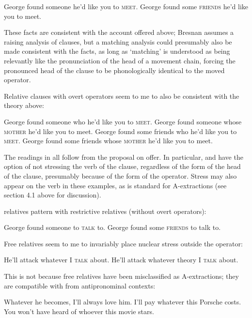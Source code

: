 \documentclass[output=paper]{LSP/langsci}
\begin{document}
\ea George found someone he'd like you to \textsc{meet}.
\ex George found some \textsc{friends} he'd like you to meet.
\z
\z

These facts are consistent with the account offered above; Bresnan assumes a raising analysis of  clauses, but a matching analysis could presumably also be made consistent with the facts, as long as `matching' is understood as being relevantly like the pronunciation of the head of a movement chain, forcing the pronounced head of the  clause to be phonologically identical to the moved operator.

  Relative clauses with overt operators seem to me to also be consistent with the theory above:


\ea%
    \label{ex:richards:48bis}
\ea \label{ex:richards:48bisa}George found someone who he'd like you to \textsc{meet}.
\ex \label{ex:richards:48bisb}George found someone whose \textsc{mother} he'd like you to meet.
\ex \label{ex:richards:48bisc}George found some friends who he'd like you to \textsc{meet}.
\ex \label{ex:richards:48bisd} George found some friends whose \textsc{mother} he'd like you to meet.
\z
\z

The readings in  all follow from the proposal on offer.  In particular,  and  have the option of not stressing the verb of the  clause, regardless of the form of the head of the  clause, presumably because of the form of the  operator.  Stress may also appear on the verb in these examples, as is standard for A-extractions (see section 4.1 above for discussion).

   relatives pattern with restrictive relatives (without overt operators):


\ea%
    \label{ex:richards:49}
\ea George found someone to \textsc{talk} to.
\ex George found some \textsc{friends} to talk to.
\z
\z

  Free relatives seem to me to invariably place nuclear stress outside the operator:


\ea%
    \label{ex:richards:50}
\ea He'll attack whatever I \textsc{talk} about.
\ex He'll attack whatever theory I \textsc{talk} about.
\z
\z

This is not because free relatives have been misclassified as A-extractions; they are compatible with  from antipronominal contexts:


\ea%
    \label{ex:richards:51}
\ea\label{ex:richards:51a} Whatever he becomes, I'll always love him.
\ex I'll pay whatever this Porsche costs.
\ex You won't have heard of whoever this movie stars.
\z
\z
\end{document}
